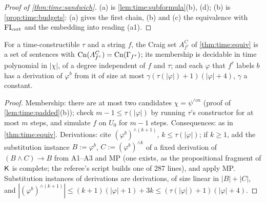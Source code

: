 \begin{proof}[Proof of \cref{thm:time:sandwich}]
(a) is \cref{lem:time:subformula}(b), (d); (b) is \cref{prop:time:budgets}: (a) gives the first chain, (b) and (c) the equivalence with $\mathrm{FI}_{\mathrm{cert}}$ and the embedding into reading (a1).
\end{proof}

\begin{lemma}\label{lem:time:clocked}
For a time-constructible $\tau$ and a string $f$, the Craig set $A^C_{f^\tau}$ of \cref{thm:time:equiv} is a set of sentences with $\mathrm{Cn}(A^C_{f^\tau})=\mathrm{Cn}(\Gamma_{f^\tau})$; its membership is decidable in time polynomial in $|\chi|$, of a degree independent of $f$ and $\tau$; and each $\varphi$ that $f^\tau$ labels $b$ has a derivation of $\varphi^b$ from it of size at most $\gamma(\tau(|\varphi|)+1)(|\varphi|+4)$, $\gamma$ a constant.
\end{lemma}

\begin{proof}
Membership: there are at most two candidates $\chi=\psi^{\wedge m}$ (proof of \cref{lem:time:padded}(b)); check $m-1\le\tau(|\varphi|)$ by running $\tau$'s constructor for at most $m$ steps, and simulate $f$ on $U_0$ for $m-1$ steps. Consequences: as in \cref{thm:time:equiv}. Derivations: cite $(\varphi^b)^{\wedge(k+1)}$, $k\le\tau(|\varphi|)$; if $k\ge1$, add the substitution instance $B:=\varphi^b$, $C:=(\varphi^b)^{\wedge k}$ of a fixed derivation of $(B\wedge C)\to B$ from A1--A3 and MP (one exists, as the propositional fragment of $\mathsf{K}$ is complete; the referee's script builds one of 287 lines), and apply MP. Substitution instances of derivations are derivations, of size linear in $|B|+|C|$, and $|(\varphi^b)^{\wedge(k+1)}|\le(k+1)(|\varphi|+1)+3k\le(\tau(|\varphi|)+1)(|\varphi|+4)$.
\end{proof}

